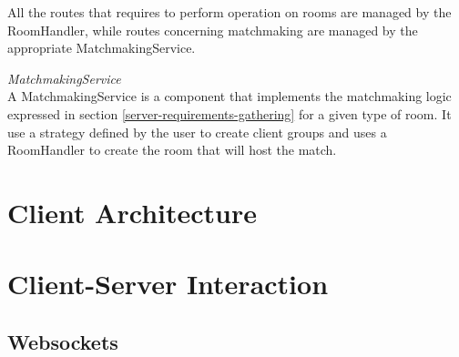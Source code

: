 All the routes that requires to perform operation on rooms are managed by the RoomHandler, while routes concerning matchmaking are managed by the appropriate MatchmakingService.


\bigskip
\textit{MatchmakingService}
\\
A MatchmakingService is a component that implements the matchmaking logic expressed in section \ref{server-requirements-gathering} for a given type of room. It use a strategy defined by the user to create client groups and uses a RoomHandler to create the room that will host the match.


\section{Client Architecture}

\section{Client-Server Interaction}
\subsection{Websockets}








